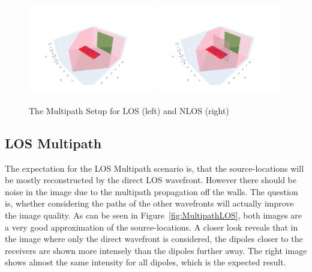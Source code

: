 \begin{figure}[ht]
    \centering
    \includegraphics[width=0.49\textwidth]{figures/setup_multipath_los.pdf}
    \includegraphics[width=0.49\textwidth]{figures/setup_multipath_nlos.pdf}
    \caption{The Multipath Setup for LOS (left) and NLOS (right)}\label{fig:MultipathNLOS_setup}
\end{figure}

\subsection{LOS Multipath}
The expectation for the LOS Multipath scenario is, that the source-locations will be mostly reconstructed by the direct LOS wavefront.
However there should be noise in the image due to the multipath propagation off the walls.
The question is, whether considering the paths of the other wavefronts will actually improve the image quality.
As can be seen in Figure~\ref{fig:MultipathLOS}, both images are a very good approximation of the source-locations.
A closer look reveals that in the image where only the direct wavefront is considered, the dipoles closer to the receivers are shown more intensely than the dipoles further away.
The right image shows almost the same intensity for all dipoles, which is the expected result.

